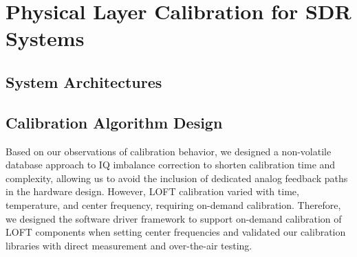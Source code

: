 	\section{Physical Layer Calibration for SDR Systems}
		\subsection{System Architectures}
		\subsection{Calibration Algorithm Design}
			Based on our observations of calibration behavior, we designed a non-volatile database approach to IQ imbalance correction to shorten calibration time and complexity, allowing us to avoid the inclusion of dedicated analog feedback paths in the hardware design.
			However, \ac{LOFT} calibration varied with time, temperature, and center frequency, requiring on-demand calibration.
			Therefore, we designed the software driver framework to support on-demand calibration of LOFT components when setting center frequencies and validated our calibration libraries with direct measurement and over-the-air testing.